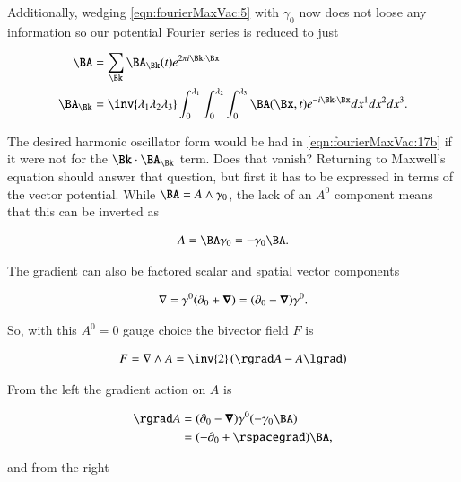 Additionally, wedging \autoref{eqn:fourierMaxVac:5} with $\gamma_0$ now does not loose any information so our potential Fourier series is reduced to just

\begin{subequations}
\label{eqn:fourierMaxVac:5b}
\begin{align}
\BA &= \sum_{\Bk} \BA_\Bk(t) e^{2 \pi i \Bk \cdot \Bx} \\
\BA_\Bk &= 
\inv{ \lambda_1 \lambda_2 \lambda_3 }
\int_0^{\lambda_1}
\int_0^{\lambda_2}
\int_0^{\lambda_3} \BA(\Bx, t) e^{-i \Bk \cdot \Bx} dx^1 dx^2 dx^3.
\end{align}
\end{subequations}

The desired harmonic oscillator form would be had in \autoref{eqn:fourierMaxVac:17b} if it were not for the $\Bk \cdot \BA_\Bk$ term.  Does that vanish?  Returning to Maxwell's equation should answer that question, but first it has to be expressed in terms of the vector potential.  While $\BA = A \wedge \gamma_0$, the lack of an $A^0$ component means that this can be inverted as

\begin{align}\label{eqn:fourierMaxVac:41}
A = \BA \gamma_0 = -\gamma_0 \BA.
\end{align}

The gradient can also be factored scalar and spatial vector components

\begin{align}\label{eqn:fourierMaxVac:42}
\nabla = \gamma^0 ( \partial_0 + \boldsymbol{\nabla} ) = ( \partial_0 - \boldsymbol{\nabla} ) \gamma^0.
\end{align}

So, with this $A^0 = 0$ gauge choice the bivector field $F$ is

\begin{align}\label{eqn:fourierMaxVac:43}
F = \grad \wedge A = \inv{2} \left( \rgrad A - A \lgrad \right) 
\end{align}

From the left the gradient action on $A$ is

\begin{align*}
\rgrad A 
&= ( \partial_0 - \spacegrad ) \gamma^0 (-\gamma_0 \BA) \\
&= ( -\partial_0 + \rspacegrad ) \BA,
\end{align*}

and from the right

